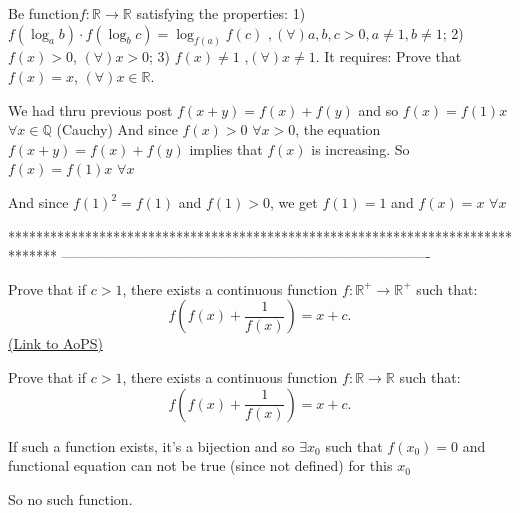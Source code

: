\begin{solution}
	Be function$f:\mathbb{R}\to \mathbb{R}$ satisfying the properties:     
     1)  $f\left( {{\log }_{a}}b \right)\cdot f\left( {{\log }_{b}}c \right)={{\log }_{f\left( a \right)}}f\left( c \right)$ $,\left( \forall  \right)a,b,c>0,a\ne 1,b\ne 1$;
     2)  $f\left( x \right)>0$, $\left( \forall  \right)x>0$;
     3)  $f\left( x \right)\ne 1$ ,$\left( \forall  \right)x\ne 1$.
It requires:
    Prove that $f\left( x \right)=x$,  $\left( \forall  \right)x\in \mathbb{R}.$
\end{solution}



\begin{solution}
	We had thru previous post $f(x+y)=f(x)+f(y)$ and so $f(x)=f(1)x$ $\forall x\in\mathbb Q$ (Cauchy)
And since $f(x)>0$ $\forall x>0$, the equation $f(x+y)=f(x)+f(y)$ implies that $f(x)$ is increasing.
So $f(x)=f(1)x$ $\forall x$

And since $f(1)^2=f(1)$ and $f(1)>0$, we get $f(1)=1$ and $f(x)=x$ $\forall x$
\end{solution}
*******************************************************************************
-------------------------------------------------------------------------------

\begin{problem}
	Prove that if $c>1$, there exists a continuous function $f:\mathbb{R}^+\to\mathbb{R}^+$ such that: \[f\left(f(x)+\frac{1}{f(x)}\right)=x+c.\]
	\flushright \href{https://artofproblemsolving.com/community/c6h482296}{(Link to AoPS)}
\end{problem}



\begin{solution}
	\begin{tcolorbox}Prove that if $c>1$, there exists a continuous function $f:\mathbb{R}\to\mathbb{R}$ such that: \[f\left(f(x)+\frac{1}{f(x)}\right)=x+c.\]\end{tcolorbox}
If such a function exists, it's a bijection and so $\exists x_0$ such that $f(x_0)=0$ and functional equation can not be true (since not defined) for this $x_0$

So no such function.
\end{solution}



